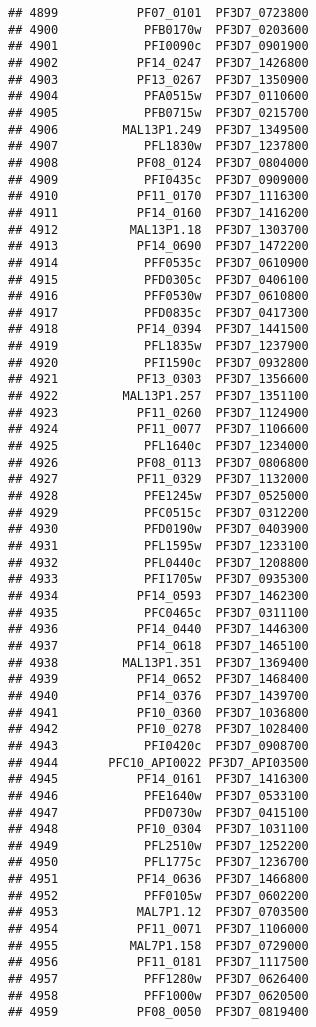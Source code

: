 \documentclass{article}\usepackage[]{graphicx}\usepackage[]{color}
\makeatletter
\newenvironment{kframe}{%
 \def\at@end@of@kframe{}%
 \ifinner\ifhmode%
  \def\at@end@of@kframe{\end{minipage}}%
  \begin{minipage}{\columnwidth}%
 \fi\fi%
 \def\FrameCommand##1{\hskip\@totalleftmargin \hskip-\fboxsep
 \colorbox{shadecolor}{##1}\hskip-\fboxsep
     \hskip-\linewidth \hskip-\@totalleftmargin \hskip\columnwidth}%
 \MakeFramed {\advance\hsize-\width
   \@totalleftmargin\z@ \linewidth\hsize
   \@setminipage}}%
 {\par\unskip\endMakeFramed%
 \at@end@of@kframe}
\newenvironment{knitrout}{}{} %
\makeatother
\begin{document}
\begin{knitrout}
\begin{kframe}
\begin{verbatim}
## 4899           PF07_0101  PF3D7_0723800
## 4900            PFB0170w  PF3D7_0203600
## 4901            PFI0090c  PF3D7_0901900
## 4902           PF14_0247  PF3D7_1426800
## 4903           PF13_0267  PF3D7_1350900
## 4904            PFA0515w  PF3D7_0110600
## 4905            PFB0715w  PF3D7_0215700
## 4906         MAL13P1.249  PF3D7_1349500
## 4907            PFL1830w  PF3D7_1237800
## 4908           PF08_0124  PF3D7_0804000
## 4909            PFI0435c  PF3D7_0909000
## 4910           PF11_0170  PF3D7_1116300
## 4911           PF14_0160  PF3D7_1416200
## 4912          MAL13P1.18  PF3D7_1303700
## 4913           PF14_0690  PF3D7_1472200
## 4914            PFF0535c  PF3D7_0610900
## 4915            PFD0305c  PF3D7_0406100
## 4916            PFF0530w  PF3D7_0610800
## 4917            PFD0835c  PF3D7_0417300
## 4918           PF14_0394  PF3D7_1441500
## 4919            PFL1835w  PF3D7_1237900
## 4920            PFI1590c  PF3D7_0932800
## 4921           PF13_0303  PF3D7_1356600
## 4922         MAL13P1.257  PF3D7_1351100
## 4923           PF11_0260  PF3D7_1124900
## 4924           PF11_0077  PF3D7_1106600
## 4925            PFL1640c  PF3D7_1234000
## 4926           PF08_0113  PF3D7_0806800
## 4927           PF11_0329  PF3D7_1132000
## 4928            PFE1245w  PF3D7_0525000
## 4929            PFC0515c  PF3D7_0312200
## 4930            PFD0190w  PF3D7_0403900
## 4931            PFL1595w  PF3D7_1233100
## 4932            PFL0440c  PF3D7_1208800
## 4933            PFI1705w  PF3D7_0935300
## 4934           PF14_0593  PF3D7_1462300
## 4935            PFC0465c  PF3D7_0311100
## 4936           PF14_0440  PF3D7_1446300
## 4937           PF14_0618  PF3D7_1465100
## 4938         MAL13P1.351  PF3D7_1369400
## 4939           PF14_0652  PF3D7_1468400
## 4940           PF14_0376  PF3D7_1439700
## 4941           PF10_0360  PF3D7_1036800
## 4942           PF10_0278  PF3D7_1028400
## 4943            PFI0420c  PF3D7_0908700
## 4944       PFC10_API0022 PF3D7_API03500
## 4945           PF14_0161  PF3D7_1416300
## 4946            PFE1640w  PF3D7_0533100
## 4947            PFD0730w  PF3D7_0415100
## 4948           PF10_0304  PF3D7_1031100
## 4949            PFL2510w  PF3D7_1252200
## 4950            PFL1775c  PF3D7_1236700
## 4951           PF14_0636  PF3D7_1466800
## 4952            PFF0105w  PF3D7_0602200
## 4953           MAL7P1.12  PF3D7_0703500
## 4954           PF11_0071  PF3D7_1106000
## 4955          MAL7P1.158  PF3D7_0729000
## 4956           PF11_0181  PF3D7_1117500
## 4957            PFF1280w  PF3D7_0626400
## 4958            PFF1000w  PF3D7_0620500
## 4959           PF08_0050  PF3D7_0819400

\end{verbatim}
\end{kframe}
\end{knitrout}
\end{document}
